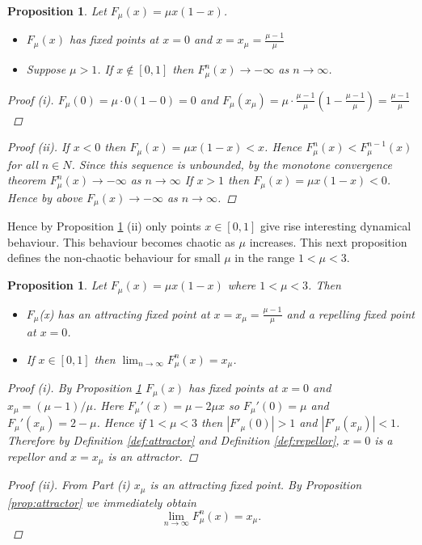 \documentclass[11pt,a4paper,oneside]{memoir}
\theoremstyle{plain}
\newtheorem{prop}[thm]{Proposition}
\theoremstyle{definition}
\begin{document}
\begin{prop} Let $F_\mu(x) = \mu x(1-x)$. \label{prop:logistic1}
    \begin{itemize}
        \item[(i)] $F_\mu(x)$ has fixed points at $x = 0$ and $x = x_{\mu} = \frac{\mu - 1}{\mu}$
        \item[(ii)] Suppose $\mu > 1$. If $x \notin [0, 1]$ then $F_\mu^n(x) \to - \infty$ as $n \to \infty$.
    \end{itemize}
    \begin{proof}[Proof (i)]
        $F_{\mu}(0) = \mu \cdot 0(1 - 0) = 0$ and $F_{\mu}(x_\mu) = \mu \cdot \frac{\mu - 1}{\mu} \left(1 - \frac{\mu - 1}{\mu}\right) = \frac{\mu - 1}{\mu}$ 
    \end{proof}
    \begin{proof}[Proof (ii)]
        If $x < 0$ then $F_\mu(x) = \mu x(1-x) < x$. Hence $F_\mu^n(x) < F_\mu^{n-1}(x)$ for all $n \in N$. Since this sequence is unbounded, by the monotone convergence theorem $F_\mu^n(x) \to - \infty$ as $n \to \infty$ If $x > 1$ then $F_\mu(x) = \mu x (1-x) < 0$. Hence by above $F_\mu(x) \to - \infty$ as $n \to \infty$.
    \end{proof}
\end{prop}
Hence by Proposition \ref{prop:logistic1} (ii) only points $x \in [0, 1]$ give rise interesting dynamical behaviour. This behaviour becomes chaotic as $\mu $ increases. This next proposition defines the non-chaotic behaviour for small $\mu$ in the range $1 < \mu < 3$.

\begin{prop} \label{prop:logistic2}
    Let $F_\mu(x) = \mu x (1-x)$ where $1 < \mu < 3$. Then
    \begin{itemize}
        \item[(i)] $F_\mu$(x) has an attracting fixed point at $x = x_\mu = \frac{\mu - 1}{\mu}$ and a repelling fixed point at $x = 0$.
        \item[(ii)] If $x \in [0, 1]$ then $\lim_{n \to \infty} F_\mu^n(x) = x_\mu$.
    \end{itemize}
    \begin{proof}[Proof (i)]
        By Proposition \ref{prop:logistic1} $F_\mu(x)$ has fixed points at $x = 0$ and $x_\mu = (\mu - 1) / \mu$. Here $F_\mu'(x) = \mu - 2\mu x$ so $F_\mu'(0) = \mu$ and $F_\mu'(x_\mu) = 2 - \mu$. Hence if $1 < \mu < 3$ then $|F'_\mu(0)| > 1$ and $|F'_\mu(x_\mu)| < 1$. Therefore by Definition \ref{def:attractor} and Definition \ref{def:repellor}, $x = 0$ is a repellor and $x = x_\mu$ is an attractor.
    \end{proof}
    \begin{proof}[Proof (ii)]
        From Part (i) $x_\mu$ is an attracting fixed point. By Proposition \ref{prop:attractor} we immediately obtain \[\lim_{n \to \infty}F_\mu^n(x) = x_\mu.\]
    \end{proof}
\end{prop}
\end{document}
